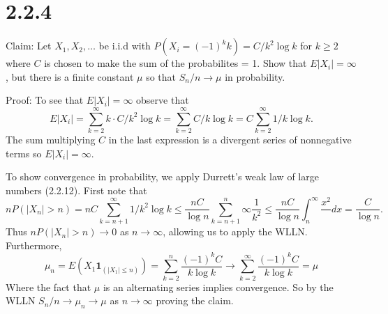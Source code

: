 \documentclass[10pt]{article}
\begin{document}
\section*{2.2.4}

Claim: Let $X_1, X_2, \dots$ be i.i.d with 
$P(X_i=(-1)^k k) = C/k^2 \log k$ for $k \ge 2$ where $C$
is chosen to make the sum of the probabilites = 1.
Show that $E \vert X_i \vert = \infty$, but there is a
finite constant $\mu$ so that $S_n/n \to \mu$ in probability.

Proof: To see that $E \vert X_i \vert = \infty$ observe that
\begin{equation*}
  E \vert X_i \vert = \sum_{k=2}^\infty k \cdot C/k^2 \log k
  = \sum_{k=2}^\infty C/k \log k = C \sum_{k=2}^\infty 1/k \log k.
\end{equation*}
The sum multiplying $C$ in the last expression is a divergent
series of nonnegative terms so $E \vert X_i \vert = \infty$.

To show convergence in probability, 
we apply Durrett's weak law of large numbers (2.2.12).
First note that
\begin{equation*}
  n P(\vert X_n \vert > n) = nC \sum_{k=n+1}^\infty 1/k^2 \log k
  \le \frac{nC}{\log n} \sum_{k=n+1}^n\infty \frac{1}{k^2}
  \le \frac{nC}{\log n} \int_n^\infty \frac{x^2} \ dx
  = \frac{C}{\log n}.
\end{equation*}
Thus $n P(\vert X_n \vert > n) \to 0$ as $n \to \infty$,
allowing us to apply the WLLN. Furthermore,
\begin{equation*}
  \mu_n = E(X_1 \mathbf{1}_{(\vert X_1 \vert \le n)})
  = \sum_{k=2}^n \frac{(-1)^kC}{k \log k}
  \to \sum_{k=2}^\infty \frac{(-1)^kC}{k \log k} =\mu
\end{equation*}
Where the fact that $\mu$ is an alternating series implies
convergence. So by the WLLN $S_n/n \to \mu_n \to \mu$
as $n \to \infty$ proving the claim.
\end{document}

